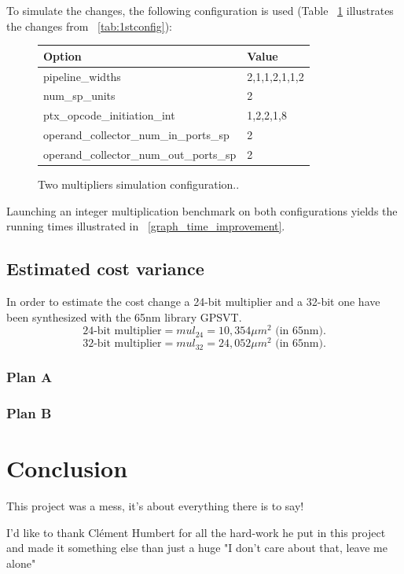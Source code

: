 \documentclass{report}
\begin{document}
    To simulate the changes, the following configuration is used (Table ~\ref{tab:2ndconfig}
    illustrates the changes from ~\ref{tab:1stconfig}):
    \begin{figure}[H]
    \centering
        \begin{tabular}{ | l | l | }
    	    \hline
    	    Option & Value \\ \hline
    	    pipeline\_widths & 2,1,1,2,1,1,2 \\
            num\_sp\_units & 2 \\
            ptx\_opcode\_initiation\_int & 1,2,2,1,8 \\
            operand\_collector\_num\_in\_ports\_sp & 2 \\
            operand\_collector\_num\_out\_ports\_sp & 2 \\ \hline
  	    \end{tabular}
  	\captionsetup{justification=centering}
  	\caption{Two multipliers simulation configuration..}
  	\label{tab:2ndconfig}
    \end{figure}

    Launching an integer multiplication benchmark on both configurations yields the running
    times illustrated in ~\ref{graph_time_improvement}. 

   \section{Estimated cost variance}
   In order to estimate the cost change a 24-bit multiplier and a 32-bit one have been synthesized with the 65nm library GPSVT.
   \[\text{24-bit multiplier} = mul_{24} = 10,354 \mu m^2 \text{ (in 65nm)}.\]
   \[\text{32-bit multiplier} = mul_{32} = 24,052 \mu m^2 \text{ (in 65nm)}.\]
   \subsection{Plan A}
   \subsection{Plan B}
   
\chapter{Conclusion} 
    This project was a mess, it's about everything there is to say!
    
    I'd like to thank Cl\'{e}ment Humbert for all the hard-work he put in this project and made it something else than just a huge "I don't care about that, leave me alone"  
   
\end{document}
